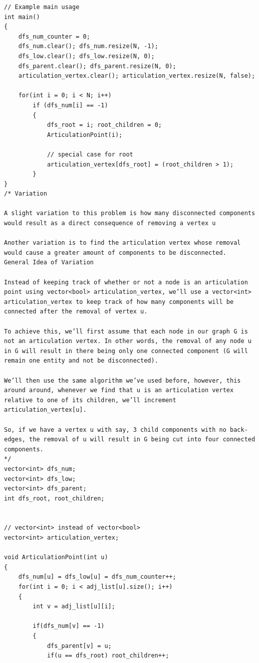 \documentclass[8pt, a4paper, oneside, twocolumn]{extarticle}
\begin{document}
\begin{itemize}
\begin{verbatim}
// Example main usage
int main() 
{
    dfs_num_counter = 0;
    dfs_num.clear(); dfs_num.resize(N, -1);
    dfs_low.clear(); dfs_low.resize(N, 0);
    dfs_parent.clear(); dfs_parent.resize(N, 0);
    articulation_vertex.clear(); articulation_vertex.resize(N, false);

    for(int i = 0; i < N; i++)
        if (dfs_num[i] == -1)
        {
            dfs_root = i; root_children = 0;
            ArticulationPoint(i);
            
            // special case for root
            articulation_vertex[dfs_root] = (root_children > 1);
        }
}
/* Variation

A slight variation to this problem is how many disconnected components would result as a direct consequence of removing a vertex u

Another variation is to find the articulation vertex whose removal would cause a greater amount of components to be disconnected.
General Idea of Variation

Instead of keeping track of whether or not a node is an articulation point using vector<bool> articulation_vertex, we’ll use a vector<int> articulation_vertex to keep track of how many components will be connected after the removal of vertex u.

To achieve this, we’ll first assume that each node in our graph G is not an articulation vertex. In other words, the removal of any node u in G will result in there being only one connected component (G will remain one entity and not be disconnected).

We’ll then use the same algorithm we’ve used before, however, this around around, whenever we find that u is an articulation vertex relative to one of its children, we’ll increment articulation_vertex[u].

So, if we have a vertex u with say, 3 child components with no back-edges, the removal of u will result in G being cut into four connected components.
*/
vector<int> dfs_num;
vector<int> dfs_low;
vector<int> dfs_parent;
int dfs_root, root_children;


// vector<int> instead of vector<bool>
vector<int> articulation_vertex;

void ArticulationPoint(int u)
{
    dfs_num[u] = dfs_low[u] = dfs_num_counter++;
    for(int i = 0; i < adj_list[u].size(); i++)
    {
        int v = adj_list[u][i];
        
        if(dfs_num[v] == -1)
        {
            dfs_parent[v] = u;
            if(u == dfs_root) root_children++;


\end{verbatim}
\end{itemize}
\end{document}
